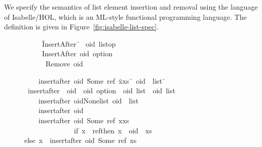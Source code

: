 We specify the semantics of list element insertion and removal using the language of Isabelle/HOL, which is an ML-style functional programming language.
The definition is given in Figure~\ref{fig:isabelle-list-spec}.

\begin{figure}
\begin{isabelle}
\begin{tabbing}
~~~~{\isacharequal}\ \=InsertAfter\ \=\kill
{}\isamarkupfalse%
\ {\isacharprime}oid\ list{\isacharunderscore}op\\
~~~~{\isacharequal}\ \>InsertAfter\ \>{\isachardoublequoteopen}{\isacharprime}oid\ option{\isachardoublequoteclose}\\
~~~~~{\isacharbar}\ \>Remove\ \>{\isacharprime}oid
\end{tabbing}
\begin{tabbing}
~~~~{\isachardoublequoteopen}insert{\isacharunderscore}after\ oid\ {\isacharparenleft}\=Some\ ref{\isacharparenright}\ {\isacharparenleft}\=x{\isacharhash}xs{\isacharparenright}\ \={\isacharequal}\ oid\ {\isacharhash}\ list{\isachardoublequoteclose}\ \=\kill
{}\isamarkupfalse%
\ insert{\isacharunderscore}after\ {\isacharcolon}{\isacharcolon}\ {\isachardoublequoteopen}{\isacharprime}oid\ {\isasymRightarrow}\ {\isacharprime}oid\ option\ {\isasymRightarrow}\ {\isacharprime}oid\ list\ {\isasymRightarrow}\ {\isacharprime}oid\ list{\isachardoublequoteclose}\ \\
~~~~{\isachardoublequoteopen}insert{\isacharunderscore}after\ oid\>None\>list\>{\isacharequal}\ oid\ {\isacharhash}\ list{\isachardoublequoteclose}\>{\isacharbar}\\
~~~~{\isachardoublequoteopen}insert{\isacharunderscore}after\ oid\>{\isacharunderscore}\>{\isacharbrackleft}\ {\isacharbrackright}\>{\isacharequal}\ {\isacharbrackleft}\ {\isacharbrackright}{\isachardoublequoteclose}\>{\isacharbar}\\
~~~~{\isachardoublequoteopen}insert{\isacharunderscore}after\ oid\ {\isacharparenleft}\>Some\ ref{\isacharparenright}\ {\isacharparenleft}\>x{\isacharhash}xs{\isacharparenright}\ \>{\isacharequal}\ {\isacharparenleft}\\
~~~~~~~~~~~~~~if\ x\ {\isacharequal}\ ref\>then\ x\ {\isacharhash}\ oid\ {\isacharhash}\ xs\\
\>else\ x\ {\isacharhash}\ {\isacharparenleft}insert{\isacharunderscore}after\ oid\ {\isacharparenleft}Some\ ref{\isacharparenright}\ xs{\isacharparenright}{\isacharparenright}{\isachardoublequoteclose}

\end{tabbing}
\end{isabelle}
\end{figure}
